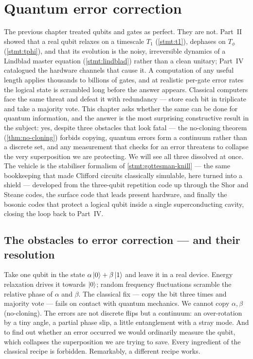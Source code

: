 \chapter{Quantum error correction}
\label{ch:qec}

The previous chapter treated qubits and gates as perfect. They are not.
Part~II showed that a real qubit relaxes on a timescale $T_1$
(\cref{stmt:t1}), dephases on $T_\phi$ (\cref{stmt:tphi}), and that its
evolution is the noisy, irreversible dynamics of a Lindblad master
equation (\cref{stmt:lindblad}) rather than a clean unitary; Part~IV
catalogued the hardware channels that cause it. A computation of any
useful length applies thousands to billions of gates, and at realistic
per-gate error rates the logical state is scrambled long before the
answer appears. Classical computers face the same threat and defeat it
with redundancy --- store each bit in triplicate and take a majority
vote. This chapter asks whether the same can be done for quantum
information, and the answer is the most surprising constructive result
in the subject: yes, despite three obstacles that look fatal --- the
no-cloning theorem (\cref{thm:no-cloning}) forbids copying, quantum
errors form a continuum rather than a discrete set, and any measurement
that checks for an error threatens to collapse the very superposition we
are protecting. We will see all three dissolved at once. The vehicle is
the stabiliser formalism of \cref{stmt:gottesman-knill} --- the same
bookkeeping that made Clifford circuits classically simulable, here
turned into a shield --- developed from the three-qubit repetition code
up through the Shor and Steane codes, the surface code that leads
present hardware, and finally the bosonic codes that protect a logical
qubit inside a single superconducting cavity, closing the loop back to
Part~IV.

\section{The obstacles to error correction --- and their resolution}
\label{sec:why-qec}

\begin{phenomenon}
Take one qubit in the state $\alpha\ket{0}+\beta\ket{1}$ and leave it in
a real device. Energy relaxation drives it towards $\ket{0}$; random
frequency fluctuations scramble the relative phase of $\alpha$ and
$\beta$. The classical fix --- copy the bit three times and majority
vote --- fails on contact with quantum mechanics. We cannot copy
$\alpha,\beta$ (no-cloning). The errors are not discrete flips but a
continuum: an over-rotation by a tiny angle, a partial phase slip, a
little entanglement with a stray mode. And to find out whether an error
occurred we would ordinarily measure the qubit, which collapses the
superposition we are trying to save. Every ingredient of the classical
recipe is forbidden. Remarkably, a different recipe works.
\end{phenomenon}

